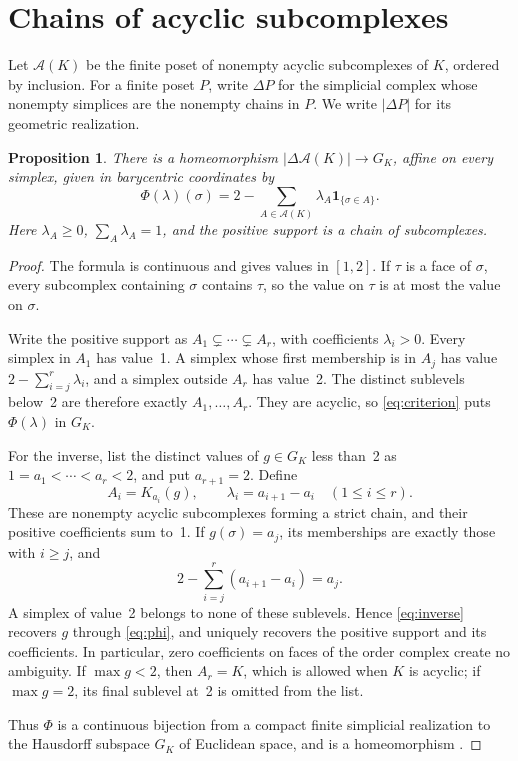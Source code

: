 \documentclass[11pt,a4paper]{article}
\newtheorem{proposition}[theorem]{Proposition}
\newcommand{\A}{\mathcal A}
\newcommand{\ind}{\mathbf 1}
\begin{document}
\section{Chains of acyclic subcomplexes}

Let $\A(K)$ be the finite poset of nonempty acyclic subcomplexes of $K$,
ordered by inclusion. For a finite poset $P$, write $\Delta P$ for the
simplicial complex whose nonempty simplices are the nonempty chains in $P$.
We write $|\Delta P|$ for its geometric realization.

\begin{proposition}\label{prop:chains}
There is a homeomorphism $|\Delta\A(K)|\to G_K$, affine on every simplex,
given in barycentric coordinates by
\begin{equation}\label{eq:phi}
 \Phi(\lambda)(\sigma)
 =2-\sum_{A\in\A(K)}\lambda_A\ind_{\{\sigma\in A\}}.
\end{equation}
Here $\lambda_A\geq0$, $\sum_A\lambda_A=1$, and the positive support is a
chain of subcomplexes.
\end{proposition}

\begin{proof}
The formula is continuous and gives values in $[1,2]$. If $\tau$ is a face
of $\sigma$, every subcomplex containing $\sigma$ contains $\tau$, so the
value on $\tau$ is at most the value on $\sigma$.

Write the positive support as $A_1\subsetneq\cdots\subsetneq A_r$, with
coefficients $\lambda_i>0$. Every simplex in $A_1$ has value~1. A simplex
whose first membership is in $A_j$ has value
$2-\sum_{i=j}^r\lambda_i$, and a simplex outside $A_r$ has value~2.
The distinct sublevels below~2 are therefore exactly $A_1,\ldots,A_r$.
They are acyclic, so \eqref{eq:criterion} puts $\Phi(\lambda)$ in $G_K$.

For the inverse, list the distinct values of $g\in G_K$ less than~2 as
$1=a_1<\cdots<a_r<2$, and put $a_{r+1}=2$. Define
\begin{equation}\label{eq:inverse}
 A_i=K_{a_i}(g),\qquad \lambda_i=a_{i+1}-a_i
 \quad(1\leq i\leq r).
\end{equation}
These are nonempty acyclic subcomplexes forming a strict chain, and their
positive coefficients sum to~1. If $g(\sigma)=a_j$, its memberships are
exactly those with $i\geq j$, and
\[
 2-\sum_{i=j}^r(a_{i+1}-a_i)=a_j.
\]
A simplex of value~2 belongs to none of these sublevels. Hence
\eqref{eq:inverse} recovers $g$ through \eqref{eq:phi}, and uniquely recovers
the positive support and its coefficients. In particular, zero coefficients
on faces of the order complex create no ambiguity. If $\max g<2$, then
$A_r=K$, which is allowed when $K$ is acyclic; if $\max g=2$, its final
sublevel at~2 is omitted from the list.

Thus $\Phi$ is a continuous bijection from a compact finite simplicial
realization to the Hausdorff subspace $G_K$ of Euclidean space, and is a
homeomorphism \cite[Theorem~26.6]{Munkres}.
\end{proof}
\end{document}
